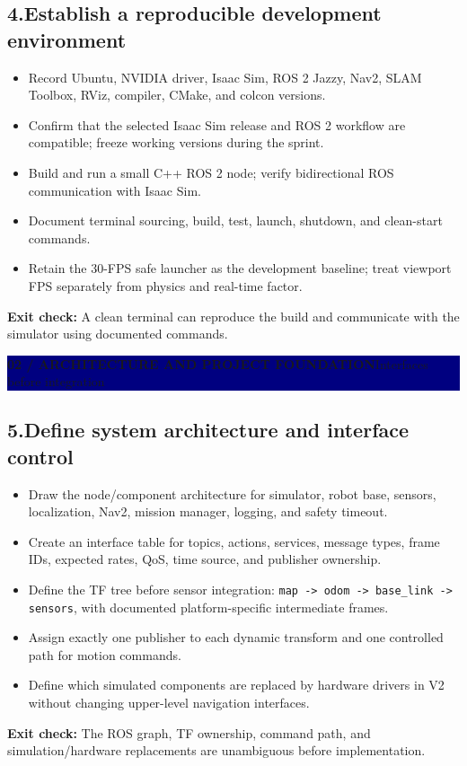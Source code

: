 \documentclass[10pt,a4paper]{article}
\newcommand{\cb}{\(\square\)}
\newcommand{\exitcheck}[1]{\vspace{2pt}\colorbox{PaleTeal}{\parbox{0.965\linewidth}{\textbf{Exit check:} #1}}}
\newcommand{\workstep}[2]{\subsection{\texorpdfstring{#1\quad #2}{#1\ #2}}}
\newcommand{\stagebanner}[2]{%
  \vspace{2pt}
  \noindent\colorbox{Navy}{\parbox{0.965\linewidth}{\color{white}\textbf{#1}\hfill #2}}
  \vspace{2pt}
}
\begin{document}
\workstep{4.}{Establish a reproducible development environment}
\begin{itemize}
  \item[\cb] Record Ubuntu, NVIDIA driver, Isaac Sim, ROS 2 Jazzy, Nav2, SLAM Toolbox, RViz, compiler, CMake, and colcon versions.
  \item[\cb] Confirm that the selected Isaac Sim release and ROS 2 workflow are compatible; freeze working versions during the sprint.
  \item[\cb] Build and run a small C++ ROS 2 node; verify bidirectional ROS communication with Isaac Sim.
  \item[\cb] Document terminal sourcing, build, test, launch, shutdown, and clean-start commands.
  \item[\cb] Retain the 30-FPS safe launcher as the development baseline; treat viewport FPS separately from physics and real-time factor.
\end{itemize}
\exitcheck{A clean terminal can reproduce the build and communicate with the simulator using documented commands.}

\newpage
\stagebanner{02 / ARCHITECTURE AND PROJECT FOUNDATION}{Interfaces before integration}

\workstep{5.}{Define system architecture and interface control}
\begin{itemize}
  \item[\cb] Draw the node/component architecture for simulator, robot base, sensors, localization, Nav2, mission manager, logging, and safety timeout.
  \item[\cb] Create an interface table for topics, actions, services, message types, frame IDs, expected rates, QoS, time source, and publisher ownership.
  \item[\cb] Define the TF tree before sensor integration: \texttt{map -> odom -> base\_link -> sensors}, with documented platform-specific intermediate frames.
  \item[\cb] Assign exactly one publisher to each dynamic transform and one controlled path for motion commands.
  \item[\cb] Define which simulated components are replaced by hardware drivers in V2 without changing upper-level navigation interfaces.
\end{itemize}
\exitcheck{The ROS graph, TF ownership, command path, and simulation/hardware replacements are unambiguous before implementation.}
\end{document}
